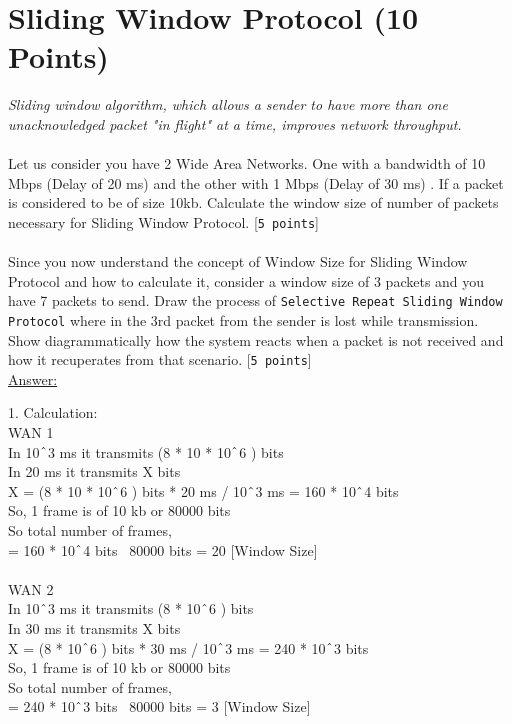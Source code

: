 \documentclass{WeSTassignment}
\begin{document}
\section{Sliding Window Protocol (10 Points)}
\emph{Sliding window algorithm, which allows a sender to have more than one unacknowledged packet "in flight" at a time, improves network throughput. }\\ \\
Let us consider you have 2 Wide Area Networks. One with a bandwidth of 10 Mbps (Delay of 20 ms) and the other with 1 Mbps (Delay of 30 ms) . If a packet is considered to be of size 10kb. Calculate the window size of number of packets necessary for Sliding Window Protocol. [\texttt{5 points}]\\ \\
Since you now understand the concept of Window Size for Sliding Window Protocol and how to calculate it, consider a window size of 3 packets and you have 7 packets to send. Draw the process of \texttt{Selective Repeat Sliding Window Protocol} where in the 3rd packet from the sender is lost while transmission. Show diagrammatically how the system reacts when a packet is not received and how it recuperates from that scenario. [\texttt{5 points}] \\

\underline{Answer:}

1. Calculation:  \\
WAN 1 \\
In 10$\string^$3 ms it transmits (8 * 10 * 10$\string^$6 ) bits \\
In 20 ms it transmits X bits \\
X = (8 * 10 * 10$\string^$6 ) bits * 20 ms / 10$\string^$3 ms = 160 * 10$\string^$4 bits \\
So, 1 frame is of 10 kb or 80000 bits \\
So total number of frames,\\
= 160 * 10$\string^$4 bits \ 80000 bits = 20 [Window Size] \\ \\

WAN 2 \\ 
In 10$\string^$3 ms it transmits (8 * 10$\string^$6 ) bits \\
In 30 ms it transmits X bits \\
X = (8 * 10$\string^$6 ) bits * 30 ms / 10$\string^$3 ms = 240 * 10$\string^$3 bits \\
So, 1 frame is of 10 kb or 80000 bits \\
So total number of frames,\\
= 240 * 10$\string^$3 bits \ 80000 bits = 3 [Window Size] \\
\end{document}
